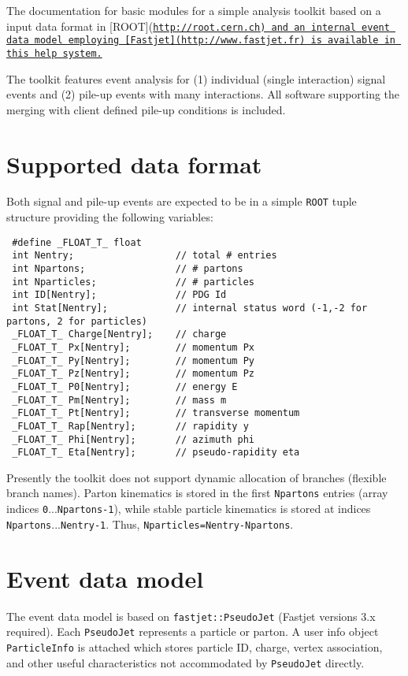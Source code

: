 The documentation for basic modules for a simple analysis toolkit based on a input data format in {\tt }\mbox{[}ROOT\mbox{]}(\href{http://root.cern.ch}\tt{http://root.cern.ch}) and an internal event data model employing \mbox{[}Fastjet\mbox{]}(\href{http://www.fastjet.fr}\tt{http://www.fastjet.fr}) is available in this help system.

The toolkit features event analysis for (1) individual (single interaction) signal events and (2) pile-up events with many interactions. All software supporting the merging with client defined pile-up conditions is included.\hypertarget{index_data_format}{}\section{Supported data format}\label{index_data_format}
Both signal and pile-up events are expected to be in a simple {\tt ROOT} tuple structure providing the following variables: 

\begin{Code}\begin{verbatim} #define _FLOAT_T_ float 
 int Nentry;                  // total # entries
 int Npartons;                // # partons
 int Nparticles;              // # particles
 int ID[Nentry];              // PDG Id
 int Stat[Nentry];            // internal status word (-1,-2 for partons, 2 for particles)
 _FLOAT_T_ Charge[Nentry];    // charge
 _FLOAT_T_ Px[Nentry];        // momentum Px
 _FLOAT_T_ Py[Nentry];        // momentum Py
 _FLOAT_T_ Pz[Nentry];        // momentum Pz
 _FLOAT_T_ P0[Nentry];        // energy E
 _FLOAT_T_ Pm[Nentry];        // mass m
 _FLOAT_T_ Pt[Nentry];        // transverse momentum
 _FLOAT_T_ Rap[Nentry];       // rapidity y
 _FLOAT_T_ Phi[Nentry];       // azimuth phi
 _FLOAT_T_ Eta[Nentry];       // pseudo-rapidity eta
\end{verbatim}\end{Code}



Presently the toolkit does not support dynamic allocation of branches (flexible branch names). Parton kinematics is stored in the first {\tt Npartons} entries (array indices {\tt 0}...{\tt Npartons-1}), while stable particle kinematics is stored at indices {\tt Npartons}...{\tt Nentry-1}. Thus, {\tt Nparticles=Nentry-Npartons}.\hypertarget{index_event_data_model}{}\section{Event data model}\label{index_event_data_model}
The event data model is based on {\tt fastjet::Pseudo\-Jet} (Fastjet versions 3.x required). Each {\tt Pseudo\-Jet} represents a particle or parton. A user info object {\tt Particle\-Info} is attached which stores particle ID, charge, vertex association, and other useful characteristics not accommodated by {\tt Pseudo\-Jet} directly.

